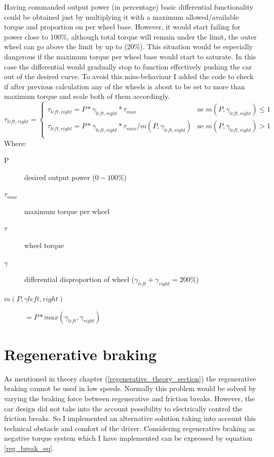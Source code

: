 Having commanded output power (in percentage) basic differential functionality could be obtained just by multiplying it with a maximum allowed/available torque and proportion on per wheel base. However, it would start failing for power close to $100\% $, although total torque will remain under the limit, the outer wheel can go above the limit by up to ($20\% $).
This situation would be especially dangerous if the maximum torque per wheel base would start to saturate. In this case the differential would gradually stop to function effectively pushing the car out of the desired curve.
To avoid this miss-behaviour I added the code to check if after previous calculation any of the wheels is about to be set to more than maximum torque and scale both of them accordingly.
\begin{equation}\label{diff_saf}
    \tau_{left,right} = \begin{cases}
        \tau_{left,right} = P * \gamma_{left,right} * \tau_{max} & \text{se $m(P,\gamma_{left,right}) \leq 1$}\\
        \tau_{left,right} = P * \gamma_{left,right} * \tau_{max} / m(P,\gamma_{left,right}) & \text{se $m(P,\gamma_{left,right}) > 1$}\\
    \end{cases}
\end{equation}
Where:
\begin{description}
    \item[P] desired output power ($0-100\%$)
    \item[$\tau_{max}$] maximum torque per wheel
    \item[$\tau$] wheel torque
    \item[$\gamma$] differential disproportion of wheel ($\gamma_{left}+\gamma_{right}=200\%$)
    \item[$m(P,\gamma{left,right})$] $= P * max(\gamma_{left},\gamma_{right})$
\end{description}

\section{Regenerative braking}
As mentioned in theory chapter (\ref{regenerative_theory_section}) the regenerative braking cannot be used in low speeds. Normally this problem would be solved by varying the braking force between regenerative and friction breaks. However, the car design did not take into the account possibility to electrically control the friction breaks. So I implemented an alternative solution taking into account this technical obstacle and comfort of the driver.
Considering regenerative braking as negative torque system which I have implemented can be expressed by equation \ref{reg_break_eq}.


